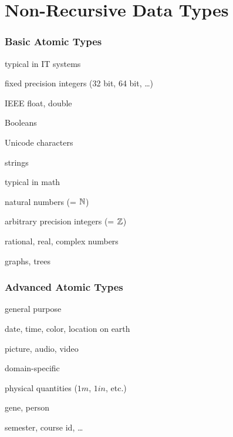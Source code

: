 \section{Non-Recursive Data Types}

\begin{frame}\frametitle{Basic Atomic Types}
\begin{blockitems}{typical in IT systems}
 \item fixed precision integers (32 bit, 64 bit, \ldots)
 \item IEEE float, double
 \item Booleans
 \item Unicode characters
 \item strings 
\end{blockitems}

\begin{blockitems}{typical in math}
 \item natural numbers (= $\mathbb{N}$)
 \item arbitrary precision integers (= $\mathbb{Z}$)
 \item rational, real, complex numbers
 \item graphs, trees
\end{blockitems}
\end{frame}

\begin{frame}\frametitle{Advanced Atomic Types}

\begin{blockitems}{general purpose}
 \item date, time, color, location on earth
 \item picture, audio, video
\end{blockitems}

\begin{blockitems}{domain-specific}
 \item physical quantities ($1m$, $1in$, etc.)
 \item gene, person
 \item semester, course id, \ldots
\end{blockitems}

\end{frame}

